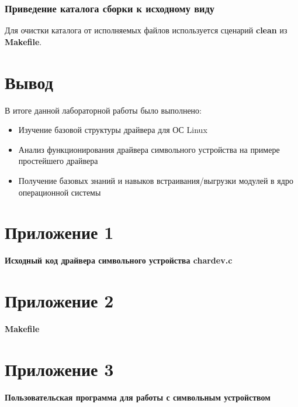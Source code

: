 


\subsubsection{Приведение каталога сборки к исходному виду}

\par Для очистки каталога от исполняемых файлов используется сценарий \textbf{clean} из \textbf{Makefile}.



\section{Вывод}
В итоге данной лабораторной работы было выполнено:
\begin{itemize}
    \item Изучение базовой структуры драйвера для ОС Linux
    \item Анализ функционирования драйвера символьного устройства на примере простейшего драйвера
    \item Получение базовых знаний и навыков встраивания/выгрузки модулей в ядро операционной системы
\end{itemize}

\clearpage

\section{Приложение 1}
\textbf{Исходный код драйвера символьного устройства chardev.c}



\section{Приложение 2}
\textbf{Makefile}


\section{Приложение 3}
\textbf{Пользовательская программа для работы с символьным устройством}




